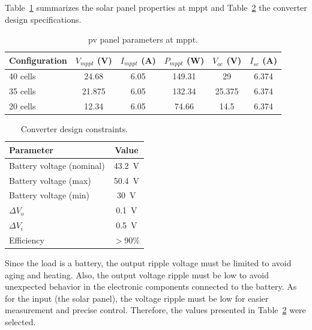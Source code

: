 Table~\ref{tab:pv_conditions} summarizes the solar panel properties at \ac{mppt} and Table~\ref{tab:converter_constraints} the converter design specifications.



\begin{table}[!ht]
    \centering
    \caption{\acs{pv} panel parameters at \acs{mppt}.}
    \label{tab:pv_conditions}
    
    \begin{tabular}{lccccc}
        \hline
        Configuration & $V_{mppt}$ (V) & $I_{mppt}$ (A) & $P_{mppt}$ (W) & $V_{oc}$ (V) & $I_{sc}$ (A) \\
        \hline
        40 cells & 24.68 & 6.05 & 149.31 & 29 & 6.374 \\
        \rowcolor{light_green}
        35 cells & 21.875 & 6.05 & 132.34 & 25.375 & 6.374 \\
        20 cells & 12.34 & 6.05 & 74.66 & 14.5 & 6.374 \\
        \hline
    \end{tabular}
\end{table}


\begin{table}[!ht]
    \centering
    \caption{Converter design constraints.}
    \label{tab:converter_constraints}
    
    \begin{tabular}{lc}
        \hline
        Parameter & Value \\
        \hline
        Battery voltage (nominal) & 43.2~V \\
        Battery voltage (max) & 50.4~V \\
        Battery voltage (min) & 30~V \\
        $\Delta V_o$ & 0.1~V \\
        $\Delta V_i$ & 0.5~V \\
        Efficiency & $> 90\%$ \\
        \hline
    \end{tabular}
\end{table}

Since the load is a battery, the output ripple voltage must be limited to avoid aging and heating. Also, the output voltage ripple must be low to avoid unexpected behavior in the electronic components connected to the battery. As for the input (the solar panel), the voltage ripple must be low for easier measurement and precise control. Therefore, the values presented in Table~\ref{tab:converter_constraints} were selected. 

